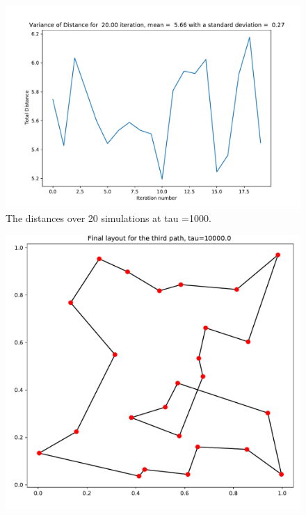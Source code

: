 \documentclass{article}
\begin{document}
 \begin{figure}[H]
     \centerline{\includegraphics[scale=0.6]{images/Q1a_distances_tau1000.pdf}}
     \caption{The distances over 20 simulations at tau =1000.}
     \label{fig:1a_distances_tau1000}
 \end{figure}
 \begin{figure}[H]
     \centerline{\includegraphics[scale=0.6]{images/Q1a_path3_tau10000.pdf}}
     \label{fig:1a_path3_tau1000}
 \end{figure}
\end{document}
